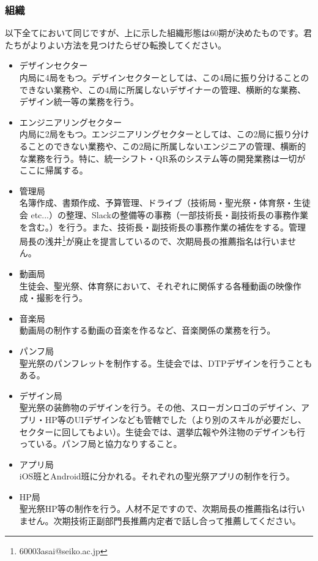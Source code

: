 \documentclass[dvipdfmx,jb5]{jarticle}
\begin{document}
\subsubsection{組織}
以下全てにおいて同じですが、上に示した組織形態は60期が決めたものです。君たちがよりよい方法を見つけたらぜひ転換してください。
\begin{itemize}
  \item デザインセクター\\
  内局に4局をもつ。デザインセクターとしては、この4局に振り分けることのできない業務や、この4局に所属しないデザイナーの管理、横断的な業務、デザイン統一等の業務を行う。
  \item エンジニアリングセクター\\
  内局に2局をもつ。エンジニアリングセクターとしては、この2局に振り分けることのできない業務や、この2局に所属しないエンジニアの管理、横断的な業務を行う。特に、統一シフト・QR系のシステム等の開発業務は一切がここに帰属する。
  \item 管理局\\
  名簿作成、書類作成、予算管理、ドライブ（技術局・聖光祭・体育祭・生徒会 etc...）の整理、Slackの整備等の事務（一部技術長・副技術長の事務作業を含む。）を行う。また、技術長・副技術長の事務作業の補佐をする。管理局長の浅井\footnote{60003asai@seiko.ac.jp}が廃止を提言しているので、次期局長の推薦指名は行いません。
  \item 動画局\\
  生徒会、聖光祭、体育祭において、それぞれに関係する各種動画の映像作成・撮影を行う。
  \item 音楽局\\
  動画局の制作する動画の音楽を作るなど、音楽関係の業務を行う。
  \item パンフ局\\
  聖光祭のパンフレットを制作する。生徒会では、DTPデザインを行うこともある。
  \item デザイン局\\
  聖光祭の装飾物のデザインを行う。その他、スローガンロゴのデザイン、アプリ・HP等のUIデザインなども管轄でした（より別のスキルが必要だし、セクターに回してもよい）。生徒会では、選挙広報や外注物のデザインも行っている。パンフ局と協力なりすること。
  \item アプリ局\\
  iOS班とAndroid班に分かれる。それぞれの聖光祭アプリの制作を行う。
  \item HP局\\
  聖光祭HP等の制作を行う。人材不足ですので、次期局長の推薦指名は行いません。次期技術正副部門長推薦内定者で話し合って推薦してください。
\end{itemize}
\end{document}
